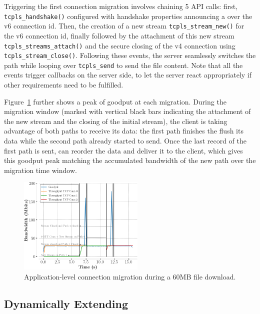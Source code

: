 Triggering the first connection migration involves chaining 5 API calls: first,
\texttt{tcpls\_handshake()} configured with handshake properties announcing a
\join over the v6 connection id. Then, the creation of a new stream
\texttt{tcpls\_stream\_new()} for the v6 connection id, finally followed by the
attachment of this new stream \texttt{tcpls\_streams\_attach()} and the secure
closing of the v4 \tcp connection using \texttt{tcpls\_stream\_close()}.
Following these events, the server seamlessly switches the path while looping
over \texttt{tcpls\_send} to send the file content. Note that all the events
trigger callbacks on the server side, to let the server react appropriately if
other requirements need to be fulfilled.

Figure~\ref{fig:conn_migration} further shows a peak of goodput at each
migration. During the migration window (marked with vertical black bars
indicating the attachment of the new stream and the closing of the initial
stream), the client is taking advantage of both paths to receive its data: the
first path finishes the flush its data while the second path already started to
send. Once the last record of the first path is sent, \tcpls can reorder the
data and deliver it to the client, which gives this goodput peak matching the
accumulated bandwidth of the new path over the migration time window.

\begin{figure}[!t]
  \begin{center}
    \includegraphics[width=6cm]{figures/migration.png}
  \end{center}
\vspace{-0.5cm}
  \caption{Application-level connection migration during a 60MB file download.}
  \label{fig:conn_migration}
\end{figure}



\subsection{Dynamically Extending \tcpls}

